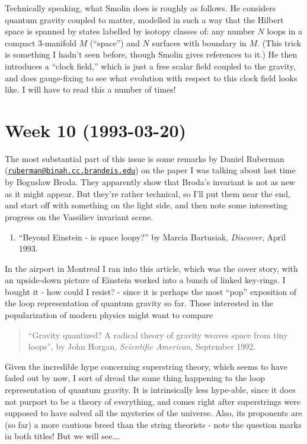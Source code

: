 \documentclass{article}
\def\tightlist{}
\begin{document}
Technically speaking, what Smolin does is roughly as follows. He
considers quantum gravity coupled to matter, modelled in such a way that
the Hilbert space is spanned by states labelled by isotopy classes of:
any number \(N\) loops in a compact 3-manifold \(M\) (``space'') and
\(N\) surfaces with boundary in \(M\). (This trick is something I hadn't
seen before, though Smolin gives references to it.) He then introduces a
``clock field,'' which is just a free scalar field coupled to the
gravity, and does gauge-fixing to see what evolution with respect to
this clock field looks like. I will have to read this a number of times!
\hypertarget{week-10-1993-03-20}{%
\section{Week 10 (1993-03-20)}\label{week-10-1993-03-20}}

The most substantial part of this issue is some remarks by Daniel
Ruberman
(\href{mailto:ruberman@binah.cc.brandeis.edu}{\nolinkurl{ruberman@binah.cc.brandeis.edu}})
on the paper I was talking about last time by Boguslaw Broda. They
apparently show that Broda's invariant is not as new as it might appear.
But they're rather technical, so I'll put them near the end, and start
off with something on the light side, and then note some interesting
progress on the Vassiliev invariant scene.

\begin{enumerate}
\def\labelenumi{\arabic{enumi})}
\tightlist
\item
  ``Beyond Einstein - is space loopy?'' by Marcia Bartusiak,
  \emph{Discover}, April 1993.
\end{enumerate}

In the airport in Montreal I ran into this article, which was the cover
story, with an upside-down picture of Einstein worked into a bunch of
linked key-rings. I bought it - how could I resist? - since it is
perhaps the most ``pop'' exposition of the loop representation of
quantum gravity so far. Those interested in the popularization of modern
physics might want to compare

\begin{quote}
``Gravity quantized? A radical theory of gravity weaves space from tiny
loops'', by John Horgan, \emph{Scientific American}, September 1992.
\end{quote}

Given the incredible hype concerning superstring theory, which seems to
have faded out by now, I sort of dread the same thing happening to the
loop representation of quantum gravity. It is intrinsically less
hype-able, since it does not purport to be a theory of everything, and
comes right after superstrings were supposed to have solved all the
mysteries of the universe. Also, its proponents are (so far) a more
cautious breed than the string theorists - note the question marks in
both titles! But we will see\ldots.
\end{document}
